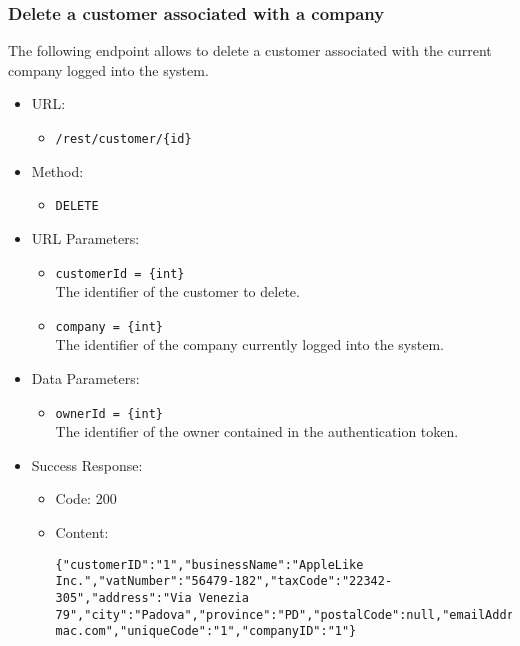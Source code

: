 \begin{itemize}
\end{itemize}


\newpage
\subsubsection*{Delete a customer associated with a company}

The following endpoint allows to delete a customer associated with the current company logged into the system.

\begin{itemize}
    
    \item URL: 
    \begin{itemize}
        \item \texttt{/rest/customer/\{id\}}
    \end{itemize}

    \item Method: 
    \begin{itemize}
        \item \texttt{DELETE}
    \end{itemize}
    
    \item URL Parameters: 
    \begin{itemize}
        \item \texttt{customerId = \{int\}} \\
        The identifier of the customer to delete.
        \item \texttt{company = \{int\}} \\
        The identifier of the company currently logged into the system.
    \end{itemize}
    
    \item Data Parameters: 
    \begin{itemize}
        \item \texttt{ownerId = \{int\}} \\
        The identifier of the owner contained in the authentication token.
    \end{itemize}
    
    \item Success Response: 
    \begin{itemize}
        \item Code: 200
        \item Content:
        \begin{lstlisting}
{"customerID":"1","businessName":"AppleLike Inc.","vatNumber":"56479-182","taxCode":"22342-305","address":"Via Venezia 79","city":"Padova","province":"PD","postalCode":null,"emailAddress":"applelike@google.com","pec":"applelike@pec-mac.com","uniqueCode":"1","companyID":"1"}
        \end{lstlisting}        
    \end{itemize}
    

\end{itemize}
